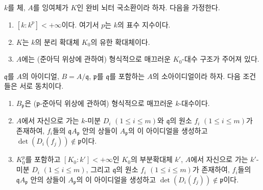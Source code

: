 \begin{theorem}[22.7.3]
\label{0.22.7.3-ko}
$k$를 체, $A$를 잉여체가 $K$인 완비 뇌터 국소환이라 하자. 다음을
가정한다.
\begin{enumerate}
  \item[$1^\circ$] $[k:k^p]<+\infty$이다. 여기서 $p$는 $k$의 표수
  지수이다.
  \item[$2^\circ$] $K$는 $k$의 분리 확대체 $K_0$의 유한 확대체이다.
  \item[$3^\circ$] $A$에는 (준아딕 위상에 관하여) 형식적으로
  매끄러운 $K_0$-대수 구조가 주어져 있다.
\end{enumerate}
$\mathfrak q$를 $A$의 아이디얼, $B=A/\mathfrak q$,
$\mathfrak p$를 $\mathfrak q$를 포함하는 $A$의 소아이디얼이라 하자.
다음 조건들은 서로 동치이다.
\begin{enumerate}
  \item[a)] $B_{\mathfrak p}$은 ($\mathfrak p$-준아딕 위상에 관하여)
  형식적으로 매끄러운 $k$-대수이다.
  \item[b)] $A$에서 자신으로 가는 $k$-미분
  $D_i$ $(1\leq i\leq m)$와 $\mathfrak q$의 원소
  $f_i$ $(1\leq i\leq m)$가 존재하여, $f_i$들의
  $\mathfrak qA_{\mathfrak p}$ 안의 상들이 $A_{\mathfrak p}$의 이
  아이디얼을 생성하고 $\det(D_i(f_j))\notin\mathfrak p$이다.
  \item[b')] $K_0^p$를 포함하고 $[K_0:k']<+\infty$인 $K_0$의
  부분확대체 $k'$, $A$에서 자신으로 가는 $k'$-미분
  $D_i$ $(1\leq i\leq m)$, 그리고 $\mathfrak q$의 원소
  $f_i$ $(1\leq i\leq m)$가 존재하여, $f_i$들의
  $\mathfrak qA_{\mathfrak p}$ 안의 상들이 $A_{\mathfrak p}$의 이
  아이디얼을 생성하고 $\det(D_i(f_j))\notin\mathfrak p$이다.
\end{enumerate}
\end{theorem}


